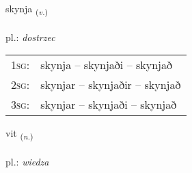 \documentclass[frontgrid, backgrid]{flacards}\usepackage[]{graphicx}\usepackage[]{xcolor}
\begin{document}
\renewcommand{\flhead}{\vskip5pt \fboxsep=0pt {\small\bfseries\footnotesize Sagnorð | Verb}}
\renewcommand{\fcfoot}{\vskip5pt \fboxsep=0pt \hspace{2pt}{\small\bfseries\footnotesize 2K}}

\renewcommand{\blhead}{\vskip5pt {\small\bfseries\footnotesize Sagnorð | Verb }}
\renewcommand{\bcfoot}{\vskip5pt \hspace{2pt}{\small\bfseries\footnotesize 2K}}


{skynja \small{\textsubscript{(\textit{v.})}} \\[1ex] %
\textphonetic{[scɪnja]} \\
pl.: \emph{dostrzec} \\  [2ex]
\renewcommand*{\arraystretch}{0.8}
\begin{tabular}{p{1cm}l}
\textsc{1sg}: & skynja -- skynjaði -- skynjað \\ 
\textsc{2sg}: & skynjar -- skynjaðir -- skynjað \\ 
\textsc{3sg}: & skynjar -- skynjaði -- skynjað \\ 
\end{tabular}
}

\renewcommand{\flhead}{\vskip5pt \fboxsep=0pt {\small\bfseries\footnotesize Nafnorð | Noun}}
\renewcommand{\fcfoot}{\vskip5pt \fboxsep=0pt \hspace{2pt}{\small\bfseries\footnotesize 2K}}

\renewcommand{\blhead}{\vskip5pt {\small\bfseries\footnotesize Nafnorð | Noun }}
\renewcommand{\bcfoot}{\vskip5pt \hspace{2pt}{\small\bfseries\footnotesize 2K}}


{vit \small{\textsubscript{(\textit{n.})}} \\[1ex] %
\textphonetic{[vɪːt]} \\
pl.: \emph{wiedza} \\  [2ex]
\renewcommand*{\arraystretch}{0.8}
}
\end{document}
